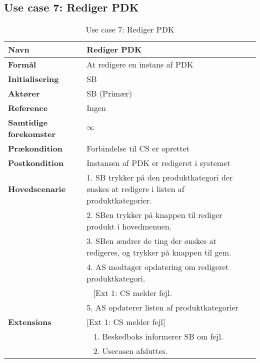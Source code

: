 \subsection{Use case 7: Rediger \gls{PDK}}


\begin{table}[H]
\begin{tabularx}{\textwidth}{|l|X|}
\hline
\textbf{Navn}					& Rediger \gls{PDK} \\\hline
\textbf{Formål}					& At redigere en instans af \gls{PDK} \\\hline
\textbf{Initialisering}			& \gls{SB} \\\hline
\textbf{Aktører}				& \gls{SB} (Primær)\\\hline
\textbf{Reference}				& Ingen \\\hline
								
\textbf{Samtidige forekomster}	& $\infty$ \\\hline

\textbf{Prækondition}			& Forbindelse til \gls{CS} er oprettet \\\hline

\textbf{Postkondition}			& Instansen af \gls{PDK} er redigeret i systemet \\\hline

\textbf{Hovedscenarie}			& 1. \gls{SB} trykker på den produktkategori der ønskes at redigere i listen af produktkategorier. \\		
								& 2. \gls{SB}en trykker på knappen til rediger produkt i hovedmenuen.\\
								& 3.  \gls{SB}en ændrer de ting der ønskes at redigeres, og trykker på knappen til gem. \\
								& 4. \gls{AS} modtager opdatering om redigeret produktkategori. \\
								& ~ [Ext 1: \gls{CS} melder fejl.\\
								& 5. \gls{AS} opdaterer listen af produktkategorier \\\hline

\textbf{Extensions}							
								& [Ext 1: \gls{CS} melder fejl]\\
								& ~ 1. Beskedboks informerer \gls{SB} om fejl.\\
								& ~ 2. Usecasen afsluttes.\\\hline
\end{tabularx}
\caption{Use case 7: Rediger \gls{PDK}}
\label{tab:UCrpk}
\end{table}